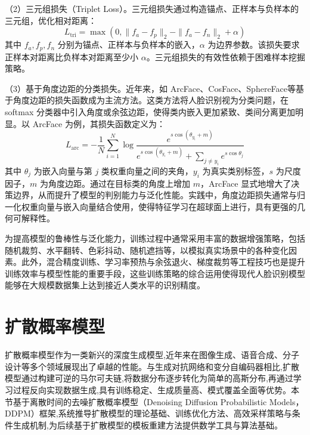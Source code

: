 （2）三元组损失（Triplet Loss）\cite{schroff2015facenet}。三元组损失通过构造锚点、正样本与负样本的三元组，优化相对距离：
\begin{equation}\label{eq:triplet_loss}
      L_{\text{tri}} = \max\left(0, \|f_a - f_p\|_2 - \|f_a - f_n\|_2 + \alpha\right)
\end{equation}
其中 $f_a, f_p, f_n$ 分别为锚点、正样本与负样本的嵌入，$\alpha$ 为边界参数。该损失要求正样本对距离比负样本对距离至少小 $\alpha$。三元组损失的有效性依赖于困难样本挖掘策略。

（3）基于角度边距的分类损失。近年来，如 ArcFace\cite{deng2019arcface}、CosFace\cite{wang2018cosface}、SphereFace\cite{liu2017sphereface}等基于角度边距的损失函数成为主流方法。这类方法将人脸识别视为分类问题，在 softmax 分类器中引入角度或余弦边距，使得类内嵌入更加紧致、类间分离更加明显。以 ArcFace 为例，其损失函数定义为：
\begin{equation}\label{eq:arcface_loss}
      L_{\text{arc}} = -\frac{1}{N}\sum_{i=1}^N \log \frac{e^{s\cos(\theta_{y_i}+m)}}{e^{s\cos(\theta_{y_i}+m)} + \sum_{j\neq y_i} e^{s\cos\theta_j}}
\end{equation}
其中 $\theta_j$ 为嵌入向量与第 $j$ 类权重向量之间的夹角，$y_i$ 为真实类别标签，$s$ 为尺度因子，$m$ 为角度边距。通过在目标类的角度上增加 $m$，ArcFace 显式地增大了决策边界，从而提升了模型的判别能力与泛化性能。实践中，角度边距损失通常与归一化权重向量与嵌入向量结合使用，使得特征学习在超球面上进行，具有更强的几何可解释性。

为提高模型的鲁棒性与泛化能力，训练过程中通常采用丰富的数据增强策略，包括随机裁剪、水平翻转、色彩抖动、随机遮挡等，以模拟真实场景中的各种变化因素。此外，混合精度训练、学习率预热与余弦退火、梯度裁剪等工程技巧也是提升训练效率与模型性能的重要手段，这些训练策略的综合运用使得现代人脸识别模型能够在大规模数据集上达到接近人类水平的识别精度。

\section{扩散概率模型}\label{sec:diffusion_models}

扩散概率模型作为一类新兴的深度生成模型,近年来在图像生成、语音合成、分子设计等多个领域展现出了卓越的性能\cite{ho2020denoising,song2020score}。与生成对抗网络\cite{goodfellow2020generative}和变分自编码器\cite{kingma2013auto}相比,扩散模型通过构建可逆的马尔可夫链,将数据分布逐步转化为简单的高斯分布,再通过学习过程反向实现数据生成,具有训练稳定、生成质量高、模式覆盖全面等优势。本节基于离散时间的去噪扩散概率模型（Denoising Diffusion Probabilistic Models，DDPM）框架,系统推导扩散模型的理论基础、训练优化方法、高效采样策略与条件生成机制,为后续基于扩散模型的模板重建方法提供数学工具与算法基础。

